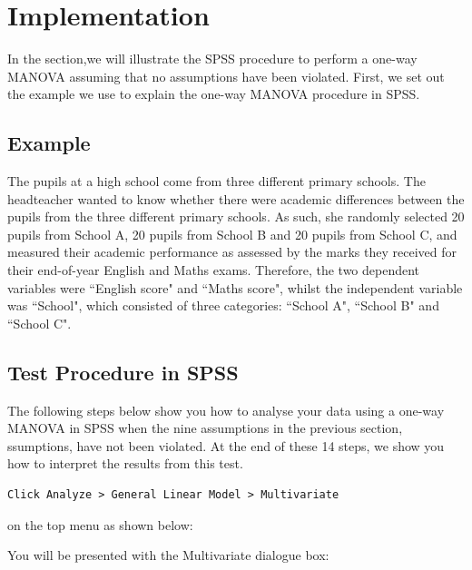 \documentclass[a4paper,12pt]{article}
\begin{document}
\section{Implementation}
In the section,we will illustrate the SPSS procedure to perform a one-way MANOVA assuming that no assumptions have been violated. First, we set out the example we use to explain the one-way MANOVA procedure in SPSS.



\subsection{Example}
The pupils at a high school come from three different primary schools. The headteacher wanted to know whether there were academic differences between the pupils from the three different primary schools. As such, she randomly selected 20 pupils from School A, 20 pupils from School B and 20 pupils from School C, and measured their academic performance as assessed by the marks they received for their end-of-year English and Maths exams. Therefore, the two dependent variables were ``English score" and ``Maths score", whilst the independent variable was ``School", which consisted of three categories: ``School A", ``School B" and ``School C".





\subsection{Test Procedure in SPSS}
The following steps below show you how to analyse your data using a one-way MANOVA in SPSS when the nine assumptions in the previous section, ssumptions, have not been violated. At the end of these 14 steps, we show you how to interpret the results from this test.
\begin{verbatim}
Click Analyze > General Linear Model > Multivariate
\end{verbatim}
on the top menu as shown below:



You will be presented with the Multivariate dialogue box:
\end{document}
